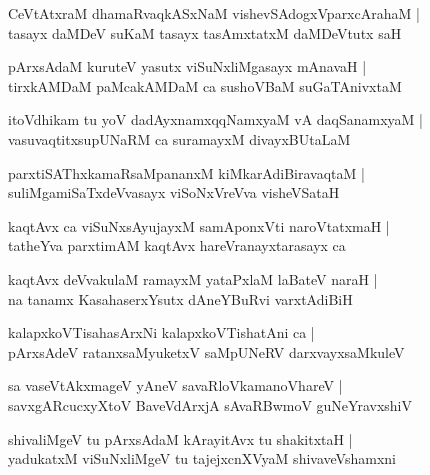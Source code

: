 \documentclass[twoside,12pt,openright]{book}
\newcounter{shloka}[chapter]
\begin{document}
\begin{shloka}%
CeVtAtxraM dhamaRvaqkASxNaM vishevSAdogxVparxcArahaM |\\
tasayx daMDeV suKaM tasayx tasAmxtatxM daMDeVtutx saH 
\end{shloka}

\begin{shloka}%
pArxsAdaM kuruteV yasutx viSuNxliMgasayx mAnavaH |\\
tirxkAMDaM paMcakAMDaM ca sushoVBaM suGaTAnivxtaM
\end{shloka}

\begin{shloka}%
itoVdhikam tu yoV dadAyxnamxqqNamxyaM vA daqSanamxyaM |\\
vasuvaqtitxsupUNaRM ca suramayxM divayxBUtaLaM 
\end{shloka}

\begin{shloka}%
parxtiSAThxkamaRsaMpananxM kiMkarAdiBiravaqtaM |\\
suliMgamiSaTxdeVvasayx viSoNxVreVva visheVSataH 
\end{shloka}

\begin{shloka}%
kaqtAvx ca viSuNxsAyujayxM samAponxVti naroVtatxmaH |\\
tatheYva parxtimAM kaqtAvx hareVranayxtarasayx ca 
\end{shloka}

\begin{shloka}%
kaqtAvx deVvakulaM ramayxM yataPxlaM laBateV naraH |\\
na tanamx KasahaserxYsutx dAneYBuRvi varxtAdiBiH 
\end{shloka}

\begin{shloka}%
kalapxkoVTisahasArxNi kalapxkoVTishatAni ca |\\
pArxsAdeV ratanxsaMyuketxV saMpUNeRV darxvayxsaMkuleV 
\end{shloka}

\begin{shloka}%
sa vaseVtAkxmageV yAneV savaRloVkamanoVhareV |\\
savxgARcucxyXtoV BaveVdArxjA sAvaRBwmoV guNeYravxshiV
\end{shloka}

\begin{shloka}%
shivaliMgeV tu pArxsAdaM kArayitAvx tu shakitxtaH |\\
yadukatxM viSuNxliMgeV tu tajejxcnXVyaM shivaveVshamxni
\end{shloka}
\end{document}
